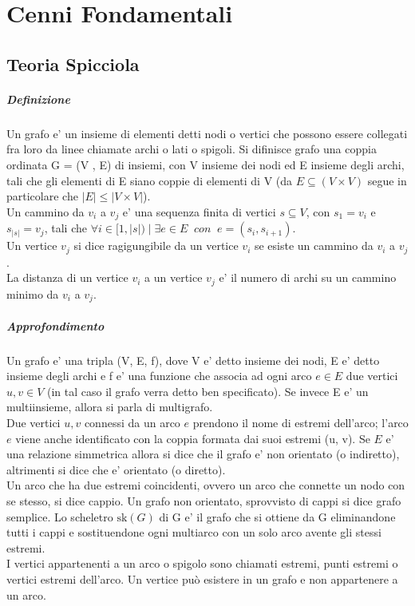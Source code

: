 \chapter{Cenni Fondamentali}

\section{Teoria Spicciola}

\paragraph{Definizione}

Un grafo e' un insieme di elementi detti nodi o vertici che possono essere collegati fra loro da linee chiamate archi o lati o spigoli.
Si difinisce grafo una coppia ordinata G = (V , E) di insiemi, con V insieme dei nodi ed E insieme degli archi, tali che gli elementi di E siano coppie di elementi di V (da $E \subseteq (V \times V)$ segue in particolare che $|E| \leq |V \times V|$). \\

Un cammino da $v_{i}$ a $v_{j}$ e' una sequenza finita di vertici $s \subseteq V$, con $s_1 = v_{i}$ e $s_{|s|} = v_{j}$, tali che $\forall i \in [1, |s|) \mid \exists e \in E \;\; con \;\; e = (s_{i}, s_{i+1})$. \\
Un vertice $v_{j}$ si dice ragigungibile da un vertice $v_{i}$ se esiste un cammino da $v_{i}$ a $v_{j}$. \\
La distanza di un vertice $v_{i}$ a un vertice $v_{j}$ e' il numero di archi su un cammino minimo da $v_{i}$ a $v_{j}$.

\paragraph{Approfondimento}

Un grafo e' una tripla (V, E, f), dove V e' detto insieme dei nodi, E e' detto insieme degli archi e f e' una funzione che associa ad ogni arco $e \in E$ due vertici $u, v \in V$ (in tal caso il grafo verra detto ben specificato). Se invece E e' un multiinsieme, allora si parla di multigrafo.
\\
Due vertici $u, v$ connessi da un arco $e$ prendono il nome di estremi dell'arco; l'arco $e$ viene anche identificato con la coppia formata dai suoi estremi (u, v). Se $E$ e' una relazione simmetrica allora si dice che il grafo e' non orientato (o indiretto), altrimenti si dice che e' orientato (o diretto).
\\
Un arco che ha due estremi coincidenti, ovvero un arco che connette un nodo con se stesso, si dice cappio. Un grafo non orientato, sprovvisto di cappi si dice grafo semplice. Lo scheletro $\mathrm {sk} (G)$ di G e' il grafo che si ottiene da G eliminandone tutti i cappi e sostituendone ogni multiarco con un solo arco avente gli stessi estremi.
\\
I vertici appartenenti a un arco o spigolo sono chiamati estremi, punti estremi o vertici estremi dell'arco. Un vertice può esistere in un grafo e non appartenere a un arco.

